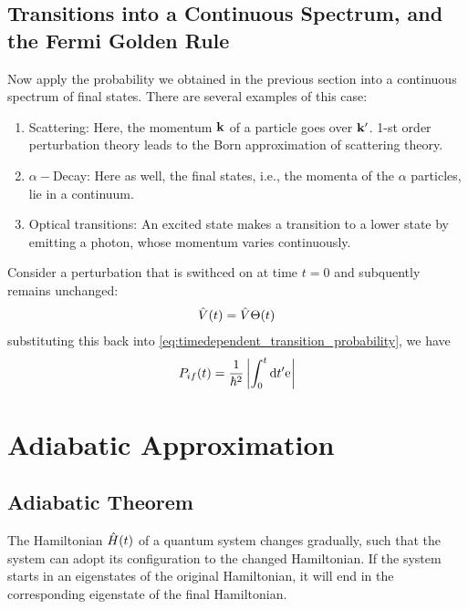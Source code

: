 \subsection{Transitions into a Continuous Spectrum, and the Fermi Golden Rule}
Now apply the probability we obtained in the previous section into a continuous spectrum of final states. There are several examples of this case: 
\begin{enumerate}
    \item Scattering: Here, the momentum $\mathbf{ k}$ of a particle goes over $\mathbf{k}'$. 1-st order perturbation theory leads to the Born approximation of scattering theory.
    \item $\alpha-$Decay: Here as well, the final states, i.e., the momenta of the $\alpha$ particles, lie in a continuum.
    \item Optical transitions: An excited state makes a transition to a lower state by emitting a photon, whose momentum varies continuously.
\end{enumerate}
Consider a perturbation that is swithced on at time $t=0$ and subquently remains unchanged: 
\begin{align}
    \hat{V}(t) = \hat{V} \Theta(t)
\end{align}
substituting this back into \cref{eq:timedependent_transition_probability}, we have
\begin{align}
    P_{if} (t) = \frac{1}{\hbar^2} \left| \int_{0}^{t} \mathrm{d} t' \mathrm{e}^{} \right|
\end{align}





\section{Adiabatic Approximation}

\subsection{Adiabatic Theorem}

\begin{definition}
    The Hamiltonian $\hat{H}(t)$ of a quantum system changes gradually, such that the system can adopt its configuration to the changed Hamiltonian. If the system starts in an eigenstates of the original Hamiltonian, it will end in the corresponding eigenstate of the final Hamiltonian.
\end{definition}

